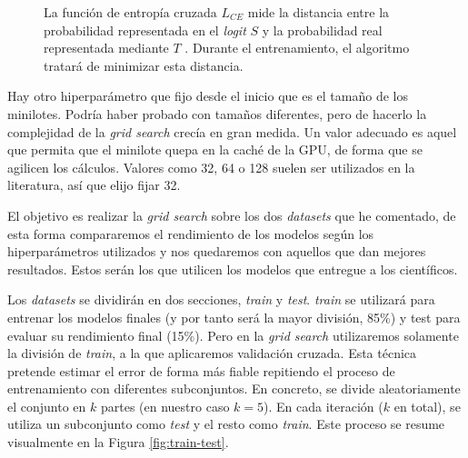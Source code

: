 \begin{figure}[H]
\centering
    \caption{La función de entropía cruzada $L_{CE}$ mide la distancia entre la probabilidad representada en el \textit{logit} $S$ y la probabilidad real representada mediante $T$ \cite{crossentropyloss}. Durante el entrenamiento, el algoritmo tratará de minimizar esta distancia.}
    \label{fig:cross-entropy-loss}
\end{figure}

Hay otro hiperparámetro que fijo desde el inicio que es el tamaño de los minilotes. Podría haber probado con tamaños diferentes, pero de hacerlo la complejidad de la \textit{grid search} crecía en gran medida. Un valor adecuado es aquel que permita que el minilote quepa en la caché de la GPU, de forma que se agilicen los cálculos. Valores como 32, 64 o 128 suelen ser utilizados en la literatura, así que elijo fijar 32. \cite{batch-size}

El objetivo es realizar la \textit{grid search} sobre los dos \textit{datasets} que he comentado, de esta forma compararemos el rendimiento de los modelos según los hiperparámetros utilizados y nos quedaremos con aquellos que dan mejores resultados. Estos serán los que utilicen los modelos que entregue a los científicos.

Los \textit{datasets} se dividirán en dos secciones, \textit{train} y \textit{test}. \textit{train} se utilizará para entrenar los modelos finales (y por tanto será la mayor división, 85\%) y test para evaluar su rendimiento final (15\%). Pero en la \textit{grid search} utilizaremos solamente la división de \textit{train}, a la que aplicaremos validación cruzada. Esta técnica pretende estimar el error de forma más fiable repitiendo el proceso de entrenamiento con diferentes subconjuntos. En concreto, se divide aleatoriamente el conjunto en $k$ partes (en nuestro caso $k=5$). En cada iteración ($k$ en total), se utiliza un subconjunto como \textit{test} y el resto como \textit{train}. Este proceso se resume visualmente en la Figura \ref{fig:train-test}. \cite{berzal2018redes}

